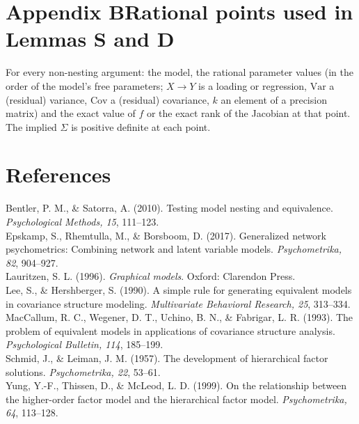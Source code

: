 \documentclass[10pt,a4paper]{article}
\begin{document}
\tableofcontents


\clearpage
\section*{Appendix B\quad Rational points used in Lemmas S and D}
For every non-nesting argument: the model, the rational parameter values (in the order of the model's free parameters; $X\to Y$ is a loading or regression, $\mathrm{Var}$ a (residual) variance, $\mathrm{Cov}$ a (residual) covariance, $k$ an element of a precision matrix) and the exact value of $f$ or the exact rank of the Jacobian at that point. The implied $\Sigma$ is positive definite at each point.

{\small
}

\section*{References}
\small
Bentler, P. M., \& Satorra, A. (2010). Testing model nesting and equivalence. \emph{Psychological Methods, 15}, 111--123.\\
Epskamp, S., Rhemtulla, M., \& Borsboom, D. (2017). Generalized network psychometrics: Combining network and latent variable models. \emph{Psychometrika, 82}, 904--927.\\
Lauritzen, S. L. (1996). \emph{Graphical models}. Oxford: Clarendon Press.\\
Lee, S., \& Hershberger, S. (1990). A simple rule for generating equivalent models in covariance structure modeling. \emph{Multivariate Behavioral Research, 25}, 313--334.\\
MacCallum, R. C., Wegener, D. T., Uchino, B. N., \& Fabrigar, L. R. (1993). The problem of equivalent models in applications of covariance structure analysis. \emph{Psychological Bulletin, 114}, 185--199.\\
Schmid, J., \& Leiman, J. M. (1957). The development of hierarchical factor solutions. \emph{Psychometrika, 22}, 53--61.\\
Yung, Y.-F., Thissen, D., \& McLeod, L. D. (1999). On the relationship between the higher-order factor model and the hierarchical factor model. \emph{Psychometrika, 64}, 113--128.
\end{document}

